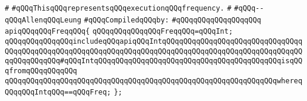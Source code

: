 \label{src/lib/compiler/back/low/library/freq.api}
\verb|#|\newline
\verb|#qQQqThisqQQqrepresentsqQQqexecutionqQQqfrequency.|\newline
\verb|#|\newline
\verb|#qQQq--qQQqAllenqQQqLeung|\newline
\newline
\verb|#qQQqCompiledqQQqby:|\newline
\verb|#qQQqqQQqqQQqqQQqqQQq|\newline
\newline
\verb|apiqQQqqQQqFreqqQQq{|\newline
\newline
\verb|qQQqqQQqqQQqqQQqFreqqQQq=qQQqInt;|\newline
\newline
\verb|qQQqqQQqqQQqqQQqincludeqQQqapiqQQqIntqQQqqQQqqQQqqQQqqQQqqQQqqQQqqQQqqQQqqQQqqQQqqQQqqQQqqQQqqQQqqQQqqQQqqQQqqQQqqQQqqQQqqQQqqQQqqQQqqQQqqQQqqQQqqQQqqQQq#qQQqIntqQQqqQQqqQQqqQQqqQQqqQQqqQQqqQQqqQQqqQQqqQQqisqQQqfromqQQqqQQqqQQq|\newline
\verb|qQQqqQQqqQQqqQQqqQQqqQQqqQQqqQQqqQQqqQQqqQQqqQQqqQQqqQQqqQQqqQQqwhereqQQqqQQqIntqQQq==qQQqFreq;|\newline
\verb|};|\newline

